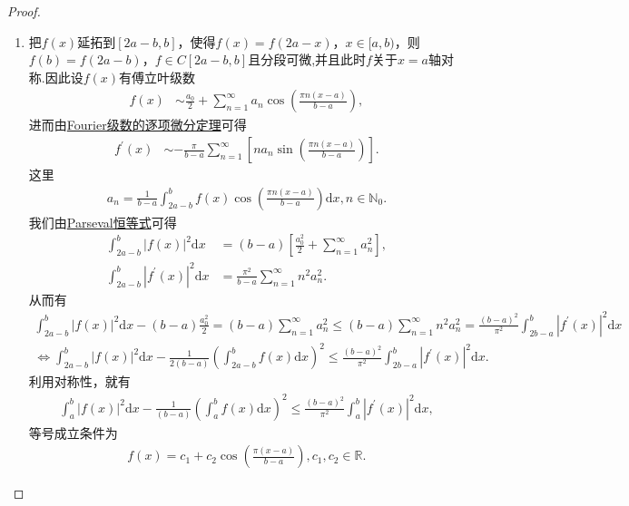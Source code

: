 \documentclass[../../main.tex]{subfiles}
\begin{document}
\begin{proof}
\begin{enumerate}[(1)]
\item 把$f(x)$延拓到$[2a - b,b]$，使得$f(x)=f(2a - x)$，$x\in[a,b)$，则$f(b)=f(2a - b)$，$f\in C[2a - b,b]$且分段可微,并且此时$f$关于$x=a$轴对称.因此设$f(x)$有傅立叶级数
\begin{align*}
f(x) &\sim \frac{a_0}{2}+\sum_{n = 1}^{\infty}a_n\cos\left(\frac{\pi n(x - a)}{b - a}\right),
\end{align*}
进而由\hyperref[theorem:Fourier级数的逐项微分定理]{Fourier级数的逐项微分定理}可得
\begin{align*}
f^{\prime}(x) &\sim -\frac{\pi}{b - a}\sum_{n = 1}^{\infty}[na_n\sin\left(\frac{\pi n(x - a)}{b - a}\right)].
\end{align*}
这里
\begin{align*}
a_n=\frac{1}{b - a}\int_{2a - b}^{b}f(x)\cos\left(\frac{\pi n(x - a)}{b - a}\right)\mathrm{d}x, n\in\mathbb{N}_0.
\end{align*}
我们由\hyperref[theorem:Parseval恒等式]{Parseval恒等式}可得
\begin{align*}
\int_{2a - b}^{b}|f(x)|^2\mathrm{d}x&=(b - a)\left[\frac{a_0^2}{2}+\sum_{n = 1}^{\infty}a_n^2\right],\\
\int_{2a - b}^{b}|f^{\prime}(x)|^2\mathrm{d}x&=\frac{\pi^2}{b - a}\sum_{n = 1}^{\infty}n^2a_n^2.
\end{align*}
从而有
\begin{gather*}
\int_{2a-b}^b{|f(x)|^2\mathrm{d}x}-\left( b-a \right) \frac{a_{0}^{2}}{2}=\left( b-a \right) \sum_{n=1}^{\infty}{a_{n}^{2}}\leqslant \left( b-a \right) \sum_{n=1}^{\infty}{n^2a_{n}^{2}}=\frac{(b-a)^2}{\pi ^2}\int_{2b-a}^b{|f^{\prime}(x)|^2\mathrm{d}x}
\\
\iff \int_{2a-b}^b{|f(x)|^2\mathrm{d}x}-\frac{1}{2(b-a)}\left( \int_{2a-b}^b{f(x)\mathrm{d}x} \right) ^2\le \frac{(b-a)^2}{\pi ^2}\int_{2b-a}^b{|f^{\prime}(x)|^2\mathrm{d}x}.
\end{gather*}
利用对称性，就有
\begin{align*}
\int_{a}^{b}|f(x)|^2\mathrm{d}x-\frac{1}{(b - a)}\left(\int_{a}^{b}f(x)\mathrm{d}x\right)^2\leq\frac{(b - a)^2}{\pi^2}\int_{a}^{b}|f^{\prime}(x)|^2\mathrm{d}x,
\end{align*}
等号成立条件为
\begin{align*}
f(x)=c_1 + c_2\cos\left(\frac{\pi(x - a)}{b - a}\right), c_1,c_2\in\mathbb{R}.
\end{align*}


\end{enumerate}
\end{proof}
\end{document}
